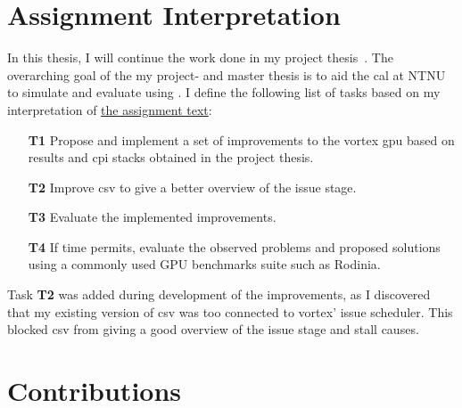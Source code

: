 
\section{Assignment Interpretation} \label{sec:tasks}

In this thesis, I will continue the work done in my project thesis~\cite{Aurud_Project}. The overarching goal of the my project- and master thesis is to aid the \acrfull{cal} at NTNU to simulate and evaluate  using . I define the following list of tasks based on my interpretation of \hyperref[chap:assignment]{the assignment text}:

\begin{itemize}
    \item[\textbf{T1}] Propose and implement a set of improvements to the \Gls{vortex} \acrshort{gpu} based on results and \acrshort{cpi} stacks obtained in the project thesis.
    \item[\textbf{T2}] Improve \acrshort{csv} to give a better overview of the issue stage. 
    \item[\textbf{T3}] Evaluate the implemented improvements.
    \item[\textbf{T4}] If time permits, evaluate the observed problems and proposed solutions using a commonly used GPU benchmarks suite such as Rodinia.
\end{itemize}

Task \textbf{T2} was added during development of the improvements, as I discovered that my existing version of \acrshort{csv} was too connected to \Gls{vortex}' issue scheduler. This blocked \acrshort{csv} from giving a good overview of the issue stage and stall causes.

\section{Contributions} \label{sec:contributions}

